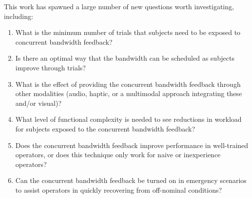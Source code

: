 This work has spawned a large number of new questions worth investigating, including:
\begin{enumerate}
    \item What is the minimum number of trials that subjects need to be exposed to concurrent bandwidth feedback?
    \item Is there an optimal way that the bandwidth can be scheduled as subjects improve through trials?
    \item What is the effect of providing the concurrent bandwidth feedback through other modalities (audio, haptic, or a multimodal approach integrating these and/or visual)?
    \item What level of functional complexity is needed to see reductions in workload for subjects exposed to the concurrent bandwidth feedback?
    \item Does the concurrent bandwidth feedback improve performance in well-trained operators, or does this technique only work for naive or inexperience operators?
    \item Can the concurrent bandwidth feedback be turned on in emergency scenarios to assist operators in quickly recovering from off-nominal conditions?
\end{enumerate}
